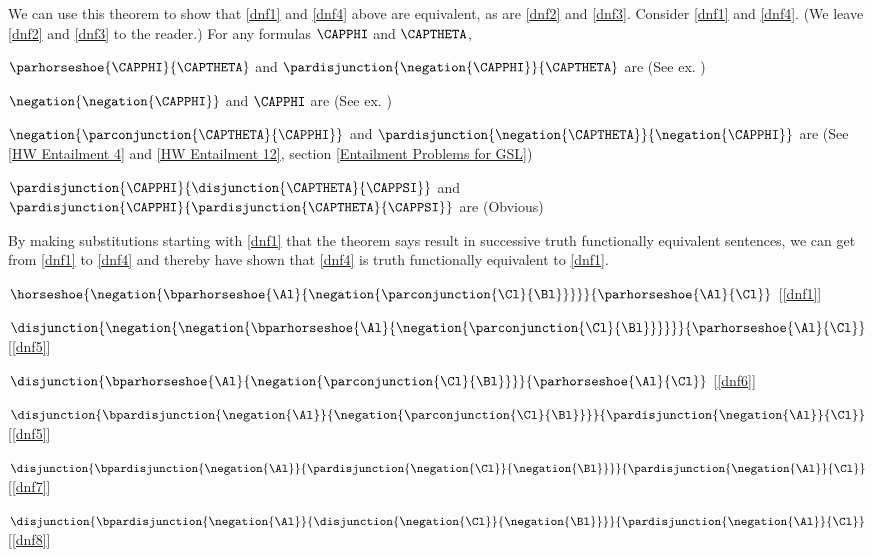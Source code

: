 \begin{majorILnc}{}
We can use this theorem to show that \ref{dnf1} and \ref{dnf4} above are equivalent, as are \ref{dnf2} and \ref{dnf3}. 
Consider \ref{dnf1} and \ref{dnf4}. 
(We leave \ref{dnf2} and \ref{dnf3} to the reader.)
For any formulas $\CAPPHI$ and $\CAPTHETA$, 
\begin{menumerate}
\item\label{dnf5} $\parhorseshoe{\CAPPHI}{\CAPTHETA}$ and $\pardisjunction{\negation{\CAPPHI}}{\CAPTHETA}$ are  (See ex. )
\item\label{dnf6} $\negation{\negation{\CAPPHI}}$ and $\CAPPHI$ are  (See ex. )
\item\label{dnf7} $\negation{\parconjunction{\CAPTHETA}{\CAPPHI}}$ and $\pardisjunction{\negation{\CAPTHETA}}{\negation{\CAPPHI}}$ are  (See \ref{HW Entailment 4} and \ref{HW Entailment 12}, section \ref{Entailment Problems for GSL})
\item\label{dnf8} $\pardisjunction{\CAPPHI}{\disjunction{\CAPTHETA}{\CAPPSI}}$ and $\pardisjunction{\CAPPHI}{\pardisjunction{\CAPTHETA}{\CAPPSI}}$ are  (Obvious)
\end{menumerate}
By making substitutions starting with \ref{dnf1} that the theorem says result in successive truth functionally equivalent sentences, we can get from \ref{dnf1} to \ref{dnf4} and thereby have shown that \ref{dnf4} is truth functionally equivalent to \ref{dnf1}.
\begin{menumerate}
\item $\horseshoe{\negation{\bparhorseshoe{\Al}{\negation{\parconjunction{\Cl}{\Bl}}}}}{\parhorseshoe{\Al}{\Cl}}$ [\ref{dnf1}]
\item $\disjunction{\negation{\negation{\bparhorseshoe{\Al}{\negation{\parconjunction{\Cl}{\Bl}}}}}}{\parhorseshoe{\Al}{\Cl}}$ [\ref{dnf5}]
\item $\disjunction{\bparhorseshoe{\Al}{\negation{\parconjunction{\Cl}{\Bl}}}}{\parhorseshoe{\Al}{\Cl}}$ [\ref{dnf6}]
\item $\disjunction{\bpardisjunction{\negation{\Al}}{\negation{\parconjunction{\Cl}{\Bl}}}}{\pardisjunction{\negation{\Al}}{\Cl}}$ [\ref{dnf5}]
\item $\disjunction{\bpardisjunction{\negation{\Al}}{\pardisjunction{\negation{\Cl}}{\negation{\Bl}}}}{\pardisjunction{\negation{\Al}}{\Cl}}$ [\ref{dnf7}]
\item $\disjunction{\bpardisjunction{\negation{\Al}}{\disjunction{\negation{\Cl}}{\negation{\Bl}}}}{\pardisjunction{\negation{\Al}}{\Cl}}$ [\ref{dnf8}]
\end{menumerate}
\end{majorILnc}

